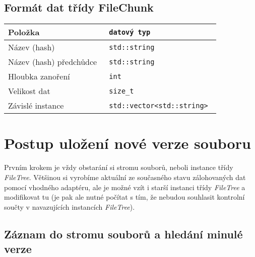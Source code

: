 \subsection{Formát dat třídy FileChunk}

\begin{tabular}{l >{\tt}l}
\bf Položka & \bf datový typ \\
\hline
Název (hash) & std::string \\
Název (hash) předchůdce & std::string \\
Hloubka zanoření & int \\
Velikost dat & size\_t \\
Závislé instance & std::vector<std::string> \\
\end{tabular}

\section{Postup uložení nové verze souboru}

Prvním krokem je vždy obstarání si stromu souborů, neboli instance třídy
{\it FileTree}. Většinou si vyrobíme aktuální ze současného stavu zálohovaných
dat pomocí vhodného adaptéru, ale je možné vzít i starší instanci třídy
{\it FileTree} a modifikovat tu (je pak ale nutné počítat s tím, že nebudou
souhlasit kontrolní součty v navazujících instancích {\it FileTree}).

\newpage

\subsection{Záznam do stromu souborů a hledání minulé verze}

